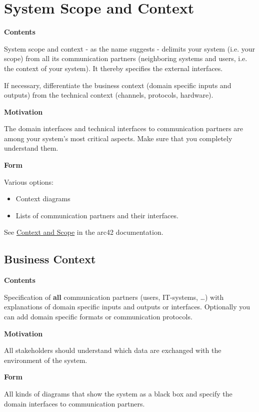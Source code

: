 \hypertarget{section-system-scope-and-context}{%
\section{System Scope and
Context}\label{section-system-scope-and-context}}

\textbf{Contents}

System scope and context - as the name suggests - delimits your system
(i.e. your scope) from all its communication partners (neighboring
systems and users, i.e. the context of your system). It thereby
specifies the external interfaces.

If necessary, differentiate the business context (domain specific inputs
and outputs) from the technical context (channels, protocols, hardware).

\textbf{Motivation}

The domain interfaces and technical interfaces to communication partners
are among your system's most critical aspects. Make sure that you
completely understand them.

\textbf{Form}

Various options:

\begin{itemize}
\item
  Context diagrams
\item
  Lists of communication partners and their interfaces.
\end{itemize}

See \href{https://docs.arc42.org/section-3/}{Context and Scope} in the
arc42 documentation.

\hypertarget{_business_context}{%
\subsection{Business Context}\label{_business_context}}

\textbf{Contents}

Specification of \textbf{all} communication partners (users, IT-systems,
\ldots) with explanations of domain specific inputs and outputs or
interfaces. Optionally you can add domain specific formats or
communication protocols.

\textbf{Motivation}

All stakeholders should understand which data are exchanged with the
environment of the system.

\textbf{Form}

All kinds of diagrams that show the system as a black box and specify
the domain interfaces to communication partners.

